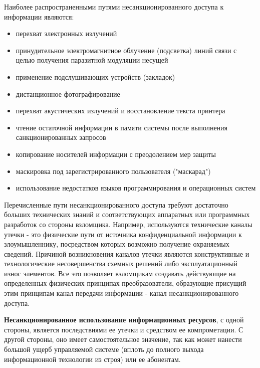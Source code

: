Наиболее распространенными путями несанкционированного доступа к информации являются:
\begin{itemize}
    \item перехват электронных излучений
    \item принудительное электромагнитное облучение (подсветка) линий связи с целью получения паразитной модуляции несущей
    \item применение подслушивающих устройств (закладок)
    \item дистанционное фотографирование
    \item перехват акустических излучений и восстановление текста принтера
    \item чтение остаточной информации в памяти системы после выполнения санкционированных запросов
    \item копирование носителей информации с преодолением мер защиты
    \item маскировка под зарегистрированного пользователя ("маскарад")
    \item использование недостатков языков программирования и операционных систем
\end{itemize}

Перечисленные пути несанкционированного доступа требуют достаточно больших технических знаний и соответствующих аппаратных или программных разработок со стороны взломщика. Например, используются технические каналы утечки - это физические пути от источника конфиденциальной информации к злоумышленнику, посредством которых возможно получение охраняемых сведений. Причиной возникновения каналов утечки являются конструктивные и технологические несовершенства схемных решений либо эксплуатационный износ элементов. Все это позволяет взломщикам создавать действующие на определенных физических принципах преобразователи, образующие присущий этим принципам канал передачи информации - канал несанкционированного доступа.

\textbf{Несанкционированное использование информационных ресурсов}, с одной стороны, является последствиями ее утечки и средством ее компрометации. С другой стороны, оно имеет самостоятельное значение, так как может нанести большой ущерб управляемой системе (вплоть до полного выхода информационной технологии из строя) или ее абонентам.

